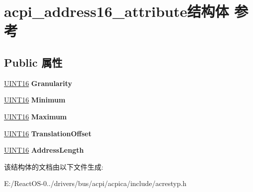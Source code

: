 \hypertarget{structacpi__address16__attribute}{}\section{acpi\+\_\+address16\+\_\+attribute结构体 参考}
\label{structacpi__address16__attribute}
\subsection*{Public 属性}
\begin{DoxyCompactItemize}
\item 
\mbox{\label{structacpi__address16__attribute_a77e82d0f38a45536879349fd28c803fd}} 
\hyperlink{_processor_bind_8h_a09f1a1fb2293e33483cc8d44aefb1eb1}{U\+I\+N\+T16} {\bfseries Granularity}
\item 
\mbox{\label{structacpi__address16__attribute_a5afba1f269c786624cc86b44aad1f948}} 
\hyperlink{_processor_bind_8h_a09f1a1fb2293e33483cc8d44aefb1eb1}{U\+I\+N\+T16} {\bfseries Minimum}
\item 
\mbox{\label{structacpi__address16__attribute_ad684e4c0f3265f5a9d41a4039d210e83}} 
\hyperlink{_processor_bind_8h_a09f1a1fb2293e33483cc8d44aefb1eb1}{U\+I\+N\+T16} {\bfseries Maximum}
\item 
\mbox{\label{structacpi__address16__attribute_a4ea52958b990757a69903945f3a94f1d}} 
\hyperlink{_processor_bind_8h_a09f1a1fb2293e33483cc8d44aefb1eb1}{U\+I\+N\+T16} {\bfseries Translation\+Offset}
\item 
\mbox{\label{structacpi__address16__attribute_aa04b7a82a972393152da0ca3ff33cc01}} 
\hyperlink{_processor_bind_8h_a09f1a1fb2293e33483cc8d44aefb1eb1}{U\+I\+N\+T16} {\bfseries Address\+Length}
\end{DoxyCompactItemize}


该结构体的文档由以下文件生成\+:\begin{DoxyCompactItemize}
\item 
E\+:/\+React\+O\+S-\/0../drivers/bus/acpi/acpica/include/acrestyp.\+h\end{DoxyCompactItemize}
